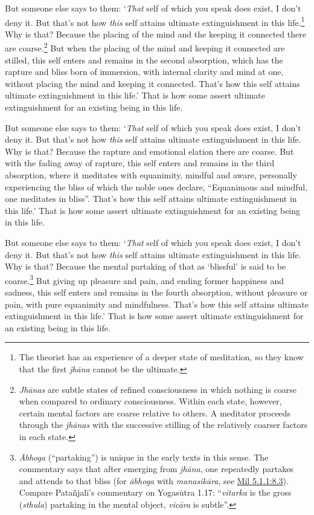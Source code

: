 \documentclass[12pt,openany]{book}%
\begin{document}
But someone else says to them: ‘\emph{That} self of which you speak does exist, I don’t deny it. But that’s not how \emph{this} self attains ultimate extinguishment in this life.\footnote{The theorist has an experience of a deeper state of meditation, so they know that the first \textit{\textsanskrit{jhāna}} cannot be the ultimate. } Why is that? Because the placing of the mind and the keeping it connected there are coarse.\footnote{\textit{\textsanskrit{Jhānas}} are subtle states of refined consciousness in which nothing is coarse when compared to ordinary consciousness. Within each state, however, certain mental factors are coarse relative to others. A meditator proceeds through the \textit{\textsanskrit{jhānas}} with the successive stilling of the relatively coarser factors in each state. } But when the placing of the mind and keeping it connected are stilled, this self enters and remains in the second absorption, which has the rapture and bliss born of immersion, with internal clarity and mind at one, without placing the mind and keeping it connected. That’s how this self attains ultimate extinguishment in this life.’ That is how some assert ultimate extinguishment for an existing being in this life. 

But someone else says to them: ‘\emph{That} self of which you speak does exist, I don’t deny it. But that’s not how \emph{this} self attains ultimate extinguishment in this life. Why is that? Because the rapture and emotional elation there are coarse. But with the fading away of rapture, this self enters and remains in the third absorption, where it meditates with equanimity, mindful and aware, personally experiencing the bliss of which the noble ones declare, “Equanimous and mindful, one meditates in bliss”. That’s how this self attains ultimate extinguishment in this life.’ That is how some assert ultimate extinguishment for an existing being in this life. 

But someone else says to them: ‘\emph{That} self of which you speak does exist, I don’t deny it. But that’s not how \emph{this} self attains ultimate extinguishment in this life. Why is that? Because the mental partaking of that as ‘blissful’ is said to be coarse.\footnote{\textit{Ābhoga} (“partaking”) is unique in the early texts in this sense. The commentary says that after emerging from \textit{\textsanskrit{jhāna}}, one repeatedly partakes and attends to that bliss (for \textit{\textsanskrit{ābhoga}} with \textit{\textsanskrit{manasikāra}}, see \href{https://suttacentral.net/mil5.1.1/en/sujato\#8.3}{Mil 5.1.1:8.3}). Compare \textsanskrit{Patañjalī}’s commentary on \textsanskrit{Yogasūtra} 1.17: “\textit{vitarka} is the gross (\textit{sthula}) partaking in the mental object, \textit{\textsanskrit{vicāra}} is subtle”. } But giving up pleasure and pain, and ending former happiness and sadness, this self enters and remains in the fourth absorption, without pleasure or pain, with pure equanimity and mindfulness. That’s how this self attains ultimate extinguishment in this life.’ That is how some assert ultimate extinguishment for an existing being in this life. 
\end{document}
